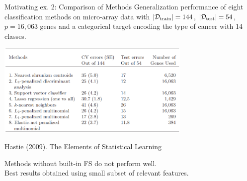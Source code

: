 \documentclass[11pt,compress,t,notes=noshow, xcolor=table]{beamer}
\begin{document}
  \begin{vbframe}{Motivating ex. 2: Comparison of Methods}
  Generalization performance of eight classification methods on micro-array data with $| \mathcal{D}_{\text{train}} | = 144$, $| \mathcal{D}_{\text{test}} | = 54$, $p=16, 063$ genes and a categorical target encoding the type of cancer with 14 classes.
\vspace{0.25cm}
  \begin{center}
  \includegraphics[width=0.7\textwidth]{figure_man/tibshirani_tab_18_1.png}

  \footnotesize{Hastie (2009). The Elements of Statistical Learning}
  \end{center}
  Methods without built-in FS do not perform well. \\ Best results obtained using small subset of relevant features.
  \end{vbframe}
\end{document}
